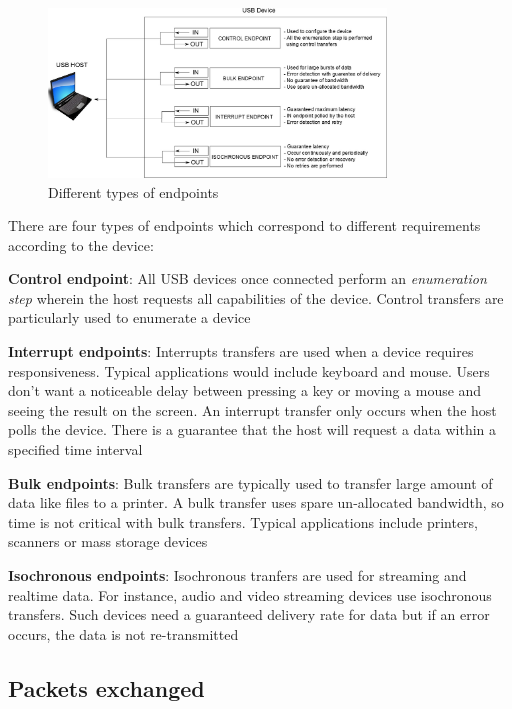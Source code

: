 \documentclass[pdftex,10pt,a4paper]{report}
\newenvironment{packed_item}{
\begin{itemize}
  \setlength{\itemsep}{1pt}
  \setlength{\parskip}{0pt}
  \setlength{\parsep}{0pt}
}{\end{itemize}}
\begin{document}

\begin{figure}[h!]
		\centering
		\includegraphics[width=0.8\textwidth]{./endpoints.jpg}
		\caption{Different types of endpoints}
		\label{Different types of endpoints}
\end{figure}

There are four types of endpoints which correspond to different requirements according to the device: 
\begin{packed_item}
	\item \textbf{Control endpoint}: All USB devices once connected perform an \textit{enumeration step} wherein the host requests all capabilities of the device. Control transfers are particularly used to enumerate a device
	\item \textbf{Interrupt endpoints}: Interrupts transfers are used when a device requires responsiveness. Typical applications would include keyboard and mouse. Users don't want a noticeable delay between pressing a key or moving a mouse and seeing the result on the screen. An interrupt transfer only occurs when the host polls the device. There is a guarantee that the host will request a data within a specified time interval
	\item \textbf{Bulk endpoints}: Bulk transfers are typically used to transfer large amount of data like files to a printer. A bulk transfer uses spare un-allocated bandwidth, so time is not critical with bulk transfers. Typical applications include printers, scanners or mass storage devices
	\item \textbf{Isochronous endpoints}: Isochronous tranfers are used for streaming and realtime data. For instance, audio and video streaming devices use isochronous transfers. Such devices need a guaranteed delivery rate for data but if an error occurs, the data is not re-transmitted
\end{packed_item}
	

\subsection{Packets exchanged}
\end{document}
